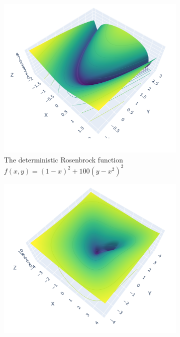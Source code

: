 \begin{figure}[h]

    \begin{subfigure}[b]{0.48\linewidth}

        \centering

        \includegraphics[width=\linewidth]{figures/2background/rosenbrock.png}

        \caption{The deterministic Rosenbrock function \\ 

        $f(x,y) = (1-x)^2 + 100(y-x^2)^2$}

        \label{fig:rosenbrock}

    \end{subfigure}

    \hfill

    \begin{subfigure}[b]{0.48\linewidth}

        \centering

        \includegraphics[width=\linewidth]{figures/2background/wood_func.png}


\end{subfigure}
\end{figure}
